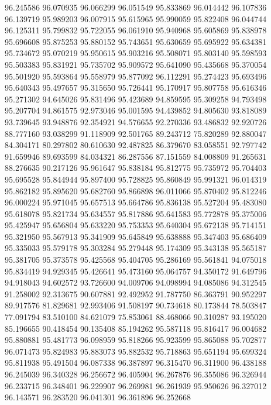 96.245586
96.070935
96.066299
96.051549
95.833869
96.014442
96.107836
96.139719
95.989203
96.007915
95.615965
95.990059
95.822408
96.044744
96.125311
95.799832
95.722055
96.061910
95.940968
95.605869
95.838978
95.696608
95.875253
95.880152
95.743651
95.630659
95.695922
95.634381
95.734672
95.070219
95.950615
95.903216
95.508071
95.803140
95.598593
95.503383
95.831921
95.735702
95.909572
95.641090
95.435668
95.370054
95.501920
95.593864
95.558979
95.877092
96.112291
95.274423
95.693496
95.640343
95.497657
95.315650
95.726441
95.170917
95.807758
95.616346
95.271302
94.645026
95.831496
95.423689
94.859595
95.309258
94.793498
95.207704
94.861575
92.973046
95.001595
94.439852
94.805630
93.818089
93.739645
93.948876
92.354921
94.576655
92.270336
93.486832
92.920726
88.777160
93.038299
91.118909
92.501765
89.243712
75.820289
92.880047
84.304171
80.297802
80.610630
92.487825
86.379670
83.058551
92.797742
91.659946
89.693599
84.034321
86.287556
87.151559
84.008809
91.265631
88.276635
90.217126
95.961647
95.838184
95.812775
95.735972
95.704403
95.695528
95.844944
95.897400
95.728825
95.860849
95.991321
96.014319
95.862182
95.895620
95.682760
95.866898
96.011066
95.870402
95.812246
96.000224
95.971045
95.657513
95.664786
95.836138
95.527204
95.483080
95.618078
95.821734
95.634557
95.817886
95.641583
95.772878
95.375006
95.425947
95.656804
95.633220
95.753353
95.640304
95.672138
95.714151
95.321950
95.567913
95.341909
95.645849
95.638888
95.347403
95.686409
95.335033
95.579178
95.303284
95.279448
95.174309
95.343138
95.565187
95.381705
95.373578
95.425568
95.404705
95.286169
95.561841
94.075018
95.834419
94.929345
95.426641
95.473160
95.064757
94.350172
91.649796
94.918043
94.602572
93.726600
94.009706
94.098994
94.085086
94.312545
91.258002
92.313675
90.607881
92.492952
91.787750
86.363791
90.952297
89.917576
81.829681
92.993406
91.508197
90.734618
80.173844
78.503847
77.091794
83.510100
84.621079
75.853061
88.468066
90.310287
93.195020
85.196655
90.418454
90.135408
85.194262
95.587118
95.816417
96.004682
95.880881
95.481773
96.098959
95.818266
95.923599
95.865088
95.702877
96.071473
95.824983
95.883073
95.882532
95.718863
95.651194
95.699324
95.811938
95.491504
96.087338
96.387897
96.315470
96.311900
96.438188
96.245039
96.340328
96.256672
96.405904
96.267876
96.355086
96.326944
96.233715
96.348401
96.229907
96.269981
96.261939
95.950626
96.327012
96.143571
96.283520
96.041301
96.361896
96.252668
